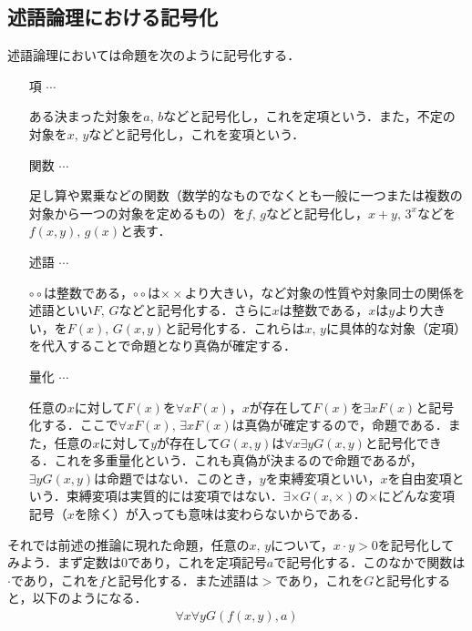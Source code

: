\documentclass[10pt,b5paper,papersize,dvipdfmx]{jsbook}
\begin{document}
\subsection{述語論理における記号化}
述語論理においては命題を次のように記号化する． 
\begin{itemize}
\item[項]$\cdots$ \par
ある決まった対象を$a,\,b$などと記号化し，これを定項という．また，不定の対象を$x,\,y$などと記号化し，これを変項という． 
\item[関数]$\cdots$ \par
足し算や累乗などの関数（数学的なものでなくとも一般に一つまたは複数の対象から一つの対象を定めるもの）を$f,\,g$などと記号化し，$x+y,\,3^x$などを$f(x,y),\,g(x)$と表す．
\item[述語]$\cdots$ \par
$\circ\circ$は整数である，$\circ\circ$は$\times\times$より大きい，など対象の性質や対象同士の関係を述語といい$F,\,G$などと記号化する．さらに$x$は整数である，$x$は$y$より大きい，を$F(x),\,G(x,y)$と記号化する．これらは$x,\,y$に具体的な対象（定項）を代入することで命題となり真偽が確定する．
\item[量化]$\cdots$ \par
任意の$x$に対して$F(x)$を$\forall xF(x)$，$x$が存在して$F(x)$を$\exists xF(x)$と記号化する．ここで$\forall xF(x),\,\exists xF(x)$は真偽が確定するので，命題である．また，任意の$x$に対して$y$が存在して$G(x,y)$は$\forall x\exists yG(x,y)$と記号化できる．これを多重量化という．これも真偽が決まるので命題であるが，$\exists yG(x,y)$は命題ではない．このとき，$y$を束縛変項といい，$x$を自由変項という．束縛変項は実質的には変項ではない．$\exists \times G(x,\times)$の$\times$にどんな変項記号（$x$を除く）が入っても意味は変わらないからである．
\end{itemize}
それでは前述の推論に現れた命題，任意の$x,\,y$について，$x\cdot y>0$を記号化してみよう．まず定数は$0$であり，これを定項記号$a$で記号化する．このなかで関数は$\cdot$であり，これを$f$と記号化する．また述語は$>$であり，これを$G$と記号化すると，以下のようになる．
\begin{align*}
\forall x\forall yG(f(x,y),a)
\end{align*}
\end{document}
